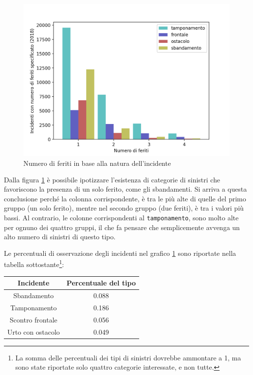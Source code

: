 \documentclass[a4paper,12pt]{report}
\newcommand{\columnstyle}[1]{\texttt{#1}}
\begin{document}
\begin{figure}
    \includegraphics[width=\linewidth]{../src/incidenti/incidenti_senza_coords/natura_incidente/natura_incidente.png}
    \caption{Numero di feriti in base alla natura dell'incidente}
    \label{fig:numero-feriti}
\end{figure}

Dalla figura \ref{fig:numero-feriti} è possibile ipotizzare l'esistenza di categorie 
di sinistri che favoriscono la presenza di un solo ferito, come gli sbandamenti. 
Si arriva a questa conclusione perché la colonna corrispondente, è tra 
le più alte di quelle del primo gruppo (un solo ferito), 
mentre nel secondo gruppo (due feriti), è tra i valori più bassi. 
Al contrario, le colonne corrispondenti al \columnstyle{tamponamento}, sono molto alte 
per ognuno dei quattro gruppi, il che fa pensare che semplicemente avvenga un alto numero 
di sinistri di questo tipo. 

Le percentuali di osservazione degli incidenti nel grafico \ref{fig:numero-feriti} sono 
riportate nella tabella sottostante\footnote{La somma delle percentuali dei tipi di 
sinistri dovrebbe ammontare a 1, ma sono state riportate solo quattro categorie 
interessate, e non tutte.}: 

\begin{center}
    \def\arraystretch{1.5}%
    \begin{tabular}{ |c|c| } 
    \hline
    Incidente & Percentuale del tipo \\ 
    \hline
    \rowcolor{TableGray}
    Sbandamento       & 0.088 \\
    Tamponamento      & 0.186 \\
    \rowcolor{TableGray}
    Scontro frontale  & 0.056 \\
    Urto con ostacolo & 0.049 \\
    \hline
    \end{tabular}
\end{center}
\end{document}

